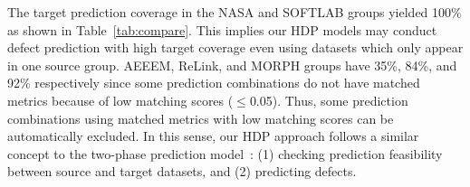 The target prediction coverage in the NASA and SOFTLAB groups yielded 100\% as
shown in Table~\ref{tab:compare}. This implies our HDP models may conduct defect
prediction with high target coverage even using datasets which only appear in
one source group. AEEEM, ReLink, and MORPH groups have 35\%, 84\%, and 92\% respectively
since some prediction combinations do not have matched metrics because of low matching scores ($\leq$0.05).
Thus, some prediction combinations
using matched metrics with low matching scores can be automatically excluded. In
this sense, our HDP approach follows a similar concept to the two-phase
prediction model~\cite{Kim13}: (1) checking prediction feasibility between
source and target datasets, and (2) predicting defects.



%
%
%


